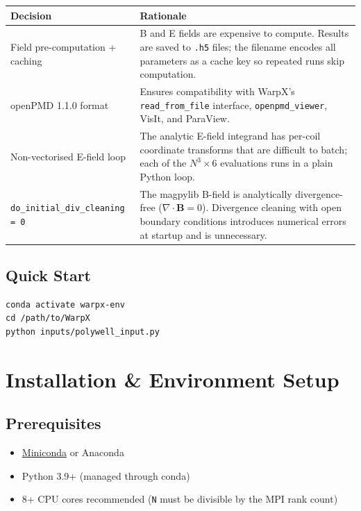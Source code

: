 \documentclass[11pt, a4paper]{article}
\begin{document}
\begin{longtable}{L{4.5cm} L{9.5cm}}
\toprule
\textbf{Decision} & \textbf{Rationale} \\
\midrule
Field pre-computation + caching &
    B and E fields are expensive to compute. Results are saved to \texttt{.h5} files;
    the filename encodes all parameters as a cache key so repeated runs skip computation. \\[0.4em]
openPMD 1.1.0 format &
    Ensures compatibility with WarpX's \texttt{read\_from\_file} interface,
    \texttt{openpmd\_viewer}, VisIt, and ParaView. \\[0.4em]
Non-vectorised E-field loop &
    The analytic E-field integrand has per-coil coordinate transforms that are
    difficult to batch; each of the $N^3 \times 6$ evaluations runs in a plain Python loop. \\[0.4em]
\texttt{do\_initial\_div\_cleaning = 0} &
    The magpylib B-field is analytically divergence-free ($\nabla \cdot \mathbf{B} = 0$).
    Divergence cleaning with open boundary conditions introduces numerical errors
    at startup and is unnecessary. \\
\bottomrule
\end{longtable}

\subsection*{Quick Start}
\begin{lstlisting}[style=bash]
conda activate warpx-env
cd /path/to/WarpX
python inputs/polywell_input.py
\end{lstlisting}

\section{Installation \& Environment Setup}

\subsection{Prerequisites}
\begin{itemize}
    \item \href{https://docs.conda.io/en/latest/miniconda.html}{Miniconda} or Anaconda
    \item Python 3.9+ (managed through conda)
    \item 8+ CPU cores recommended (\texttt{N} must be divisible by the MPI rank count)
\end{itemize}
\end{document}
